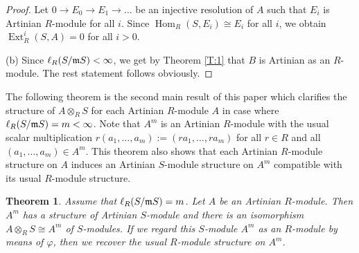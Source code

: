 \documentclass[a4papersize]{article}
\newtheorem{theorem}{Theorem}[section]
\DeclareMathOperator{\Hom}{Hom}
\DeclareMathOperator{\Ext}{Ext}
\begin{document}
\begin{proof}
  Let $ 0\to E_0\to E_1\to\ldots$ be an injective resolution of $A$ such that $E_i$ is Artinian $R$-module for all $i$. Since $\Hom_R(S,E_i)\cong E_i$ for all $i$, we obtain  $\Ext^i_R(S, A)=0$ for all $i>0.$
 
(b) Since $\ell_R(S/\frak mS)<\infty$, we get by Theorem \ref{T:1} that $B$ is Artinian as an $R$-module. The rest statement follows obviously. 
\end{proof}

  The following theorem is the second main result of this paper which clarifies the structure of $A\otimes_RS$ for each Artinian $R$-module $A$ in case where $\ell_R(S/\frak mS)=m<\infty$. Note that  $A^m$ is an Artinian $R$-module with the usual scalar multiplication $r(a_1, \ldots , a_m):=(ra_1, \ldots , ra_m)$ for all $r\in R$ and all $(a_1, \ldots , a_m)\in A^m.$   This theorem also shows that each Artinian $R$-module structure on $A$ induces an Artinian $S$-module structure on $A^m$ compatible with its usual $R$-module structure. 

\begin{theorem} \label{T:2} Assume that $\ell_R(S/\frak mS)=m$. Let $A$ be an Artinian $R$-module. Then  $A^m$ has a structure of Artinian $S$-module and there is an isomorphism $A\otimes_RS\cong A^m$ of $S$-modules. If we regard this $S$-module $A^m$ as an $R$-module by means of $\varphi$, then we recover the usual $R$-module structure on $A^m$.  
\end{theorem}
\end{document}
